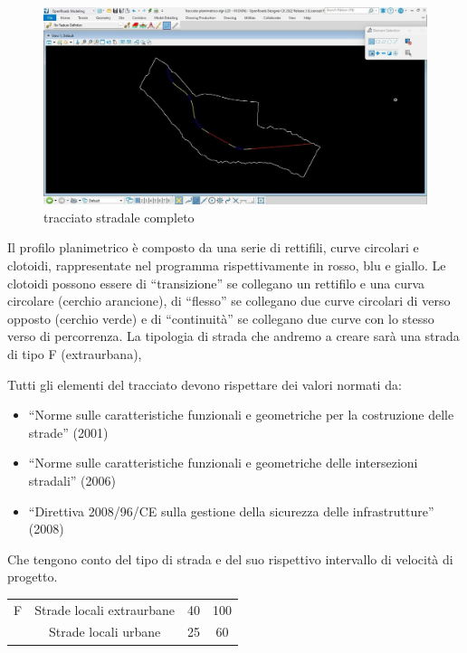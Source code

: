 \begin{figure}[H]
    \includegraphics[width=\textwidth]{Figures/tracciato stradale completo.jpg}
      \caption{tracciato stradale completo}
      \label{tracciato stradale completo}
\end{figure}

Il profilo planimetrico è composto da una serie di rettifili, curve circolari e clotoidi, rappresentate nel programma rispettivamente in rosso, blu e giallo.
Le clotoidi possono essere di “transizione” se collegano un rettifilo e una curva circolare (cerchio arancione), di “flesso” se collegano due curve circolari di verso opposto (cerchio verde) e di “continuità” se collegano due curve con lo stesso verso di percorrenza.
La tipologia di strada che andremo a creare sarà una strada di tipo F (extraurbana), 


Tutti gli elementi del tracciato devono rispettare dei valori normati da:

\begin{itemize}
    \item[\bullet] “Norme sulle caratteristiche funzionali e geometriche per la costruzione delle strade” (2001) 
    \item[\bullet] “Norme sulle caratteristiche funzionali e geometriche delle intersezioni stradali” (2006)
    \item[\bullet] “Direttiva 2008/96/CE sulla gestione della sicurezza delle infrastrutture” (2008)
\end{itemize}

Che tengono conto del tipo di strada e del suo rispettivo intervallo di velocità di progetto.

\begin{table}[H]
    \begin{center}
    \begin{tabular}{|c|c|c|c|}
    \hline
    {\color[HTML]{FE0000} F}                   & {\color[HTML]{FE0000} Strade locali extraurbane} & {\color[HTML]{FE0000} 40} & {\color[HTML]{FE0000} 100} \\ \cline{2-4} 
    \multirow{-2}{*}{{\color[HTML]{FE0000} }} & {\color[HTML]{FE0000} Strade locali urbane} & {\color[HTML]{FE0000} 25} & {\color[HTML]{FE0000} 60} \\ \hline
    \end{tabular}
 \end{center}
\end{table}

